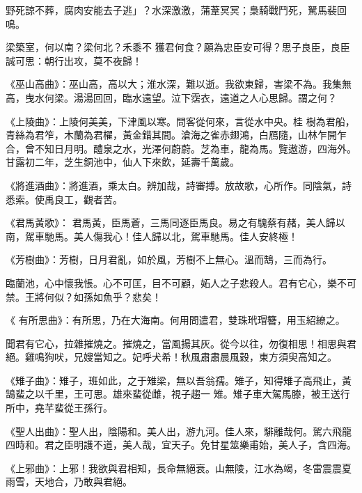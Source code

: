 \begin{pinyinscope}
 野死諒不葬，腐肉安能去子逃」？水深激激，蒲葦冥冥；梟騎戰鬥死，駑馬裴回鳴。



 梁築室，何以南？梁何北？禾黍不
 獲君何食？願為忠臣安可得？思子良臣，良臣誠可思：朝行出攻，莫不夜歸！



 《巫山高曲》：巫山高，高以大；淮水深，難以逝。我欲東歸，害梁不為。我集無高，曳水何梁。湯湯回回，臨水遠望。泣下霑衣，遠道之人心思歸。謂之何？



 《上陵曲》：上陵何美美，下津風以寒。問客從何來，言從水中央。桂
 樹為君船，青絲為君笮，木蘭為君櫂，黃金錯其間。滄海之雀赤翅鴻，白鴈隨，山林乍開乍合，曾不知日月明。醴泉之水，光澤何蔚蔚。芝為車，龍為馬。覽遨游，四海外。甘露初二年，芝生銅池中，仙人下來飲，延壽千萬歲。



 《將進酒曲》：將進酒，乘太白。辨加哉，詩審搏。放故歌，心所作。同陰氣，詩悉索。使禹良工，觀者苦。



 《君馬黃歌》：
 君馬黃，臣馬蒼，三馬同逐臣馬良。易之有騩蔡有赭，美人歸以南，駕車馳馬。美人傷我心！佳人歸以北，駕車馳馬。佳人安終極！



 《芳樹曲》：芳樹，日月君亂，如於風，芳樹不上無心。溫而鵠，三而為行。



 臨蘭池，心中懷我悵。心不可匡，目不可顧，妬人之子悲殺人。君有它心，樂不可禁。王將何似？如孫如魚乎？悲矣！



 《
 有所思曲》：有所思，乃在大海南。何用問遣君，雙珠玳瑁簪，用玉紹繚之。



 聞君有它心，拉雜摧燒之。摧燒之，當風揚其灰。從今以往，勿復相思！相思與君絕。雞鳴狗吠，兄嫂當知之。妃呼犬希！秋風肅肅晨風穀，東方須臾高知之。



 《雉子曲》：雉子，班如此，之于雉梁，無以吾翁孺。雉子，知得雉子高飛止，黃鵠蜚之以千里，王可思。雄來蜚從雌，視子趨一
 雉。雉子車大駕馬滕，被王送行所中，堯芊蜚從王孫行。



 《聖人出曲》：聖人出，陰陽和。美人出，游九河。佳人來，騑離哉何。駕六飛龍四時和。君之臣明護不道，美人哉，宜天子。免甘星筮樂甫始，美人子，含四海。



 《上邪曲》：上邪！我欲與君相知，長命無絕衰。山無陵，江水為竭，冬雷震震夏雨雪，天地合，乃敢與君絕。




\end{pinyinscope}
